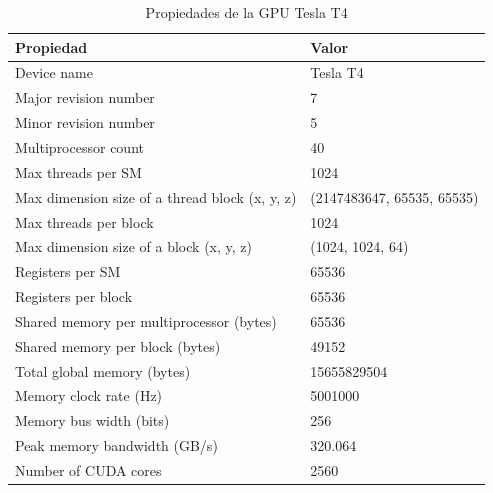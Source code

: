 \documentclass{article}
\begin{document}
		\begin{table}[H]
			\begin{tabular}{|l|l|}
				\hline
				\textbf{Propiedad} & \textbf{Valor} \\ \hline
				Device name & Tesla T4 \\ \hline
				Major revision number & 7 \\ \hline
				Minor revision number & 5 \\ \hline
				Multiprocessor count & 40 \\ \hline
				Max threads per SM & 1024 \\ \hline
				Max dimension size of a thread block (x, y, z) & (2147483647, 65535, 65535) \\ \hline
				Max threads per block & 1024 \\ \hline
				Max dimension size of a block (x, y, z) & (1024, 1024, 64) \\ \hline
					Registers per SM & 65536 \\ \hline
				Registers per block & 65536 \\ \hline
				Shared memory per multiprocessor (bytes) & 65536 \\ \hline
				Shared memory per block (bytes) & 49152 \\ \hline
				Total global memory (bytes) & 15655829504 \\ \hline
				Memory clock rate (Hz) & 5001000 \\ \hline
				Memory bus width (bits) & 256 \\ \hline
				Peak memory bandwidth (GB/s) & 320.064 \\ \hline
				Number of CUDA cores & 2560 \\ \hline
			\end{tabular}
			\centering
			\caption{Propiedades de la GPU Tesla T4}
		\end{table}
\end{document}

